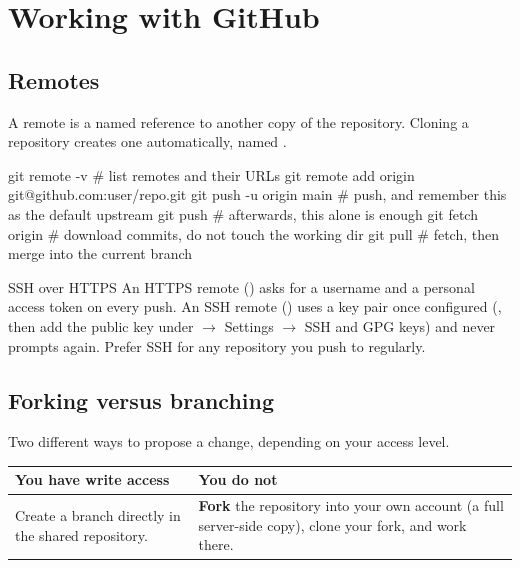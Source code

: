 \chapter{Working with GitHub}
\label{ch:github}


\section{Remotes}

A remote is a named reference to another copy of the repository. Cloning
a repository creates one automatically, named .

\begin{shcode}
git remote -v                                # list remotes and their URLs
git remote add origin git@github.com:user/repo.git
git push -u origin main   # push, and remember this as the default upstream
git push                  # afterwards, this alone is enough
git fetch origin          # download commits, do not touch the working dir
git pull                  # fetch, then merge into the current branch
\end{shcode}

\begin{tipbox}{SSH over HTTPS}
An HTTPS remote () asks for a username and
a personal access token on every push. An SSH remote
() uses a key pair once configured
(, then add the public key under \GitHub{} \(\to\)
Settings \(\to\) SSH and GPG keys) and never prompts again. Prefer SSH
for any repository you push to regularly.
\end{tipbox}

\section{Forking versus branching}

Two different ways to propose a change, depending on your access level.

\begin{tabularx}{\linewidth}{@{}l>{\raggedright\arraybackslash}X@{}}
\toprule
\textbf{You have write access} & \textbf{You do not}\\
\midrule
Create a branch directly in the shared repository. &
  \textbf{Fork} the repository into your own account (a full server-side
  copy), clone your fork, and work there.\\
\bottomrule
\end{tabularx}

